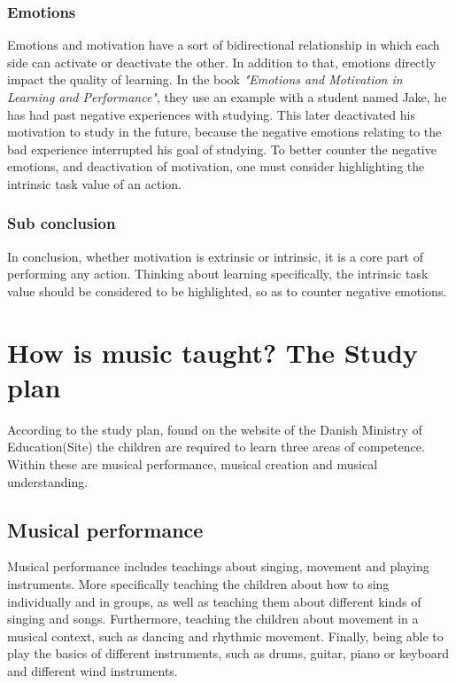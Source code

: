 \subsubsection*{Emotions}
Emotions and motivation have a sort of bidirectional relationship in which each side can activate or deactivate the other\cite[p.~66]{emotionsAndMotivation}. In addition to that, emotions directly impact the quality of learning\cite[p.~66]{emotionsAndMotivation}. In the book \textit{"Emotions and Motivation in Learning and Performance"}\cite{emotionsAndMotivation}, they use an example with a student named Jake, he has had past negative experiences with studying. This later deactivated his motivation to study in the future, because the negative emotions relating to the bad experience interrupted his goal of studying\cite[p.~67]{emotionsAndMotivation}. To better counter the negative emotions, and deactivation of motivation, one must consider highlighting the intrinsic task value of an action\cite[p.68]{emotionsAndMotivation}.
\subsubsection*{Sub conclusion}
In conclusion, whether motivation is extrinsic or intrinsic, it is a core part of performing any action. Thinking about learning specifically, the intrinsic task value should be considered to be highlighted, so as to counter negative emotions.

\section{How is music taught? The Study plan} 
According to the study plan, found on the website of the Danish Ministry of Education(Site) the children are required to learn three areas of competence. Within these are musical performance, musical creation and musical understanding.

\subsection*{Musical performance}
Musical performance includes teachings about singing, movement and playing instruments. More specifically teaching the children about how to sing individually and in groups, as well as teaching them about different kinds of singing and songs. Furthermore, teaching the children about movement in a musical context, such as dancing and rhythmic movement. Finally, being able to play the basics of different instruments, such as drums, guitar, piano or keyboard and different wind instruments.

